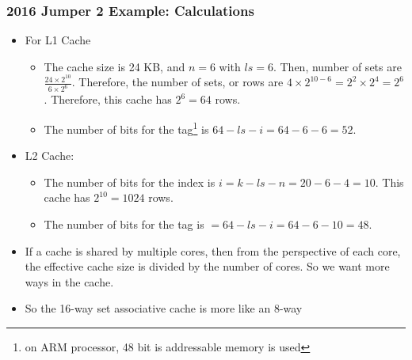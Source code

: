 \begin{frame}\frametitle{2016 Jumper 2 Example: Calculations}
\begin{itemize}
    \item For L1 Cache
    \begin{itemize}
        \item The cache size is 24 KB, and $n=6$ with $ls=6$. Then, number of sets are $\frac{24 \times 2^{10}}{6 \times 2^{6}}$. Therefore, the number of sets, or rows are $4 \times 2^{10-6} = 2^{2} \times 2^4 = 2^6$. Therefore, this cache has $ 2^{6} = 64$ rows. 
\item The number of bits for the tag\footnote{on ARM processor, 48 bit is addressable memory is used} is $64-ls-i=64-6-6=52$.
    \end{itemize}
    \item L2 Cache:
    \begin{itemize}
        \item The number of bits for the index is $i=k-ls-n=20-6-4=10$. This cache has $2^{10} = 1024$ rows.
        \item The number of bits for the tag is $=64-ls-i=64-6-10=48$.
    \end{itemize}
    \item  If a cache is shared by multiple cores, then from the perspective of each core, the effective cache size is divided by the number of cores. So we want more ways in the cache.
\item So the 16-way set associative cache is more like an 8-way 
\end{itemize}
\end{frame}

